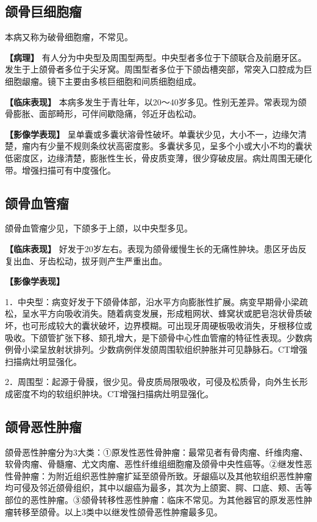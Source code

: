 \subsection{颌骨巨细胞瘤}

本病又称为破骨细胞瘤，不常见。

\textbf{【病理】}
有人分为中央型及周围型两型。中央型者多位于下颌联合及前磨牙区。发生于上颌骨者多位于尖牙窝。周围型者多位于下颌齿槽突部，常突入口腔成为巨细胞龈瘤。镜下主要由多核巨细胞和间质细胞组成。

\textbf{【临床表现】}
本病多发生于青壮年，以20～40岁多见。性别无差异。常表现为颌骨膨胀、面部畸形，可伴间歇隐痛，邻近牙齿松动。

\textbf{【影像学表现】}
呈单囊或多囊状溶骨性破坏。单囊状少见，大小不一，边缘欠清楚，瘤内有少量不规则条纹状高密度影。多囊状多见，呈多个小或大小不均的囊状低密度区，边缘清楚，膨胀性生长，骨皮质变薄，很少穿破皮层。病灶周围无硬化带。增强扫描可有中度强化。

\subsection{颌骨血管瘤}

颌骨血管瘤少见，下颌多于上颌，以中央型多见。

\textbf{【临床表现】}
好发于20岁左右。表现为颌骨缓慢生长的无痛性肿块。患区牙齿反复出血、牙齿松动，拔牙则产生严重出血。

\textbf{【影像学表现】}

1．中央型：病变好发于下颌骨体部，沿水平方向膨胀性扩展。病变早期骨小梁疏松，呈水平方向吸收消失。随着病变发展，形成粗网状、蜂窝状或肥皂泡状骨质破坏，也可形成较大的囊状破坏，边界模糊。可出现牙周硬板吸收消失，牙根移位或吸收。下颌管扩张下移、颏孔增大，是下颌骨中心性血管瘤的特征性表现。少数病例骨小梁呈放射状排列。少数病例伴发颌周围软组织肿胀并可见静脉石。CT增强扫描病灶明显强化。

2．周围型：起源于骨膜，很少见。骨皮质局限吸收，可侵及松质骨，向外生长形成密度不均的软组织肿块。CT增强扫描病灶明显强化。

\subsection{颌骨恶性肿瘤}

颌骨恶性肿瘤分为3大类：①原发性恶性骨肿瘤：最常见者有骨肉瘤、纤维肉瘤、软骨肉瘤、骨髓瘤、尤文肉瘤、恶性纤维组细胞瘤及颌骨中央性癌等。②继发性恶性骨肿瘤：为附近组织恶性肿瘤扩延至颌骨所致。牙龈癌以及其他软组织恶性肿瘤均可侵及邻近颌骨组织，其中以龈癌为最多，其次为上颌窦、腭、口底、颊、舌等部位的恶性肿瘤。③颌骨转移性恶性肿瘤：临床不常见。为其他器官的原发恶性肿瘤转移至颌骨。以上3类中以继发性颌骨恶性肿瘤最多见。

